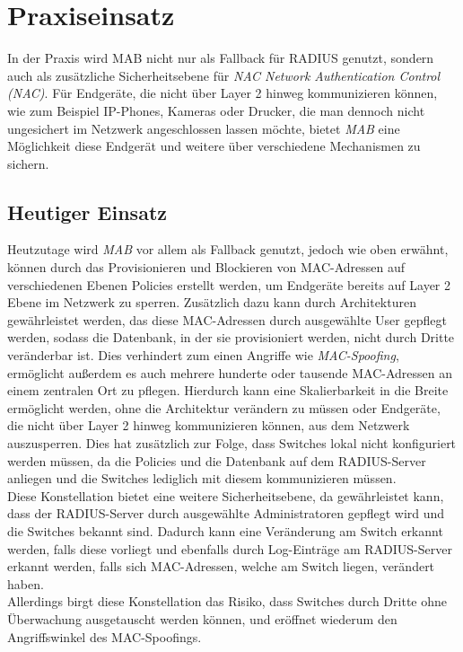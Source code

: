 \documentclass[conference]{IEEEtran}
\begin{document}
%

\vspace{1em}
\section{Praxiseinsatz}
In der Praxis wird MAB nicht nur als Fallback für RADIUS genutzt, sondern auch als zusätzliche Sicherheitsebene für \emph{NAC Network Authentication Control (NAC)}. Für Endgeräte, die nicht über Layer 2 hinweg kommunizieren können, wie zum Beispiel IP-Phones, Kameras oder Drucker, die man dennoch nicht ungesichert im Netzwerk angeschlossen lassen möchte, bietet \emph{MAB} eine Möglichkeit diese Endgerät und weitere über verschiedene Mechanismen zu sichern.\\

\vspace{.5em}
\subsection{Heutiger Einsatz}
Heutzutage wird \emph{MAB} vor allem als Fallback genutzt, jedoch wie oben erwähnt, können durch das Provisionieren und Blockieren von MAC-Adressen auf verschiedenen Ebenen Policies erstellt werden, um Endgeräte bereits auf Layer 2 Ebene im Netzwerk zu sperren. Zusätzlich dazu kann durch Architekturen gewährleistet werden, das diese MAC-Adressen durch ausgewählte User gepflegt werden, sodass die Datenbank, in der sie provisioniert werden, nicht durch Dritte veränderbar ist. Dies verhindert zum einen Angriffe wie \emph{MAC-Spoofing}, ermöglicht außerdem es auch mehrere hunderte oder tausende MAC-Adressen an einem zentralen Ort zu pflegen. Hierdurch kann eine Skalierbarkeit in die Breite ermöglicht werden, ohne die Architektur verändern zu müssen oder Endgeräte, die nicht über Layer 2 hinweg kommunizieren können, aus dem Netzwerk auszusperren. Dies hat zusätzlich zur Folge, dass Switches lokal nicht konfiguriert werden müssen, da die Policies und die Datenbank auf dem RADIUS-Server anliegen und die Switches lediglich mit diesem kommunizieren müssen.\\

Diese Konstellation bietet eine weitere Sicherheitsebene, da gewährleistet kann, dass der RADIUS-Server durch ausgewählte Administratoren gepflegt wird und die Switches bekannt sind. Dadurch kann eine Veränderung am Switch erkannt werden, falls diese vorliegt und ebenfalls durch Log-Einträge am RADIUS-Server erkannt werden, falls sich MAC-Adressen, welche am Switch liegen, verändert haben.\\
Allerdings birgt diese Konstellation das Risiko, dass Switches durch Dritte ohne Überwachung ausgetauscht werden können, und eröffnet wiederum den Angriffswinkel des MAC-Spoofings.\\
\end{document}
